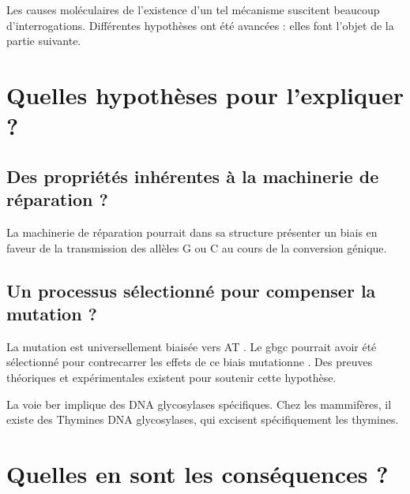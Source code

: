 \documentclass[11pt, oneside]{scrartcl}
\begin{document}
\begin{transition}
  Les causes moléculaires de l'existence d'un tel mécanisme suscitent beaucoup
  d'interrogations. Différentes hypothèses ont été avancées : elles font l'objet
  de la partie suivante. 
\end{transition}

\section{Quelles hypothèses pour l'expliquer ?}
\label{sec:orgheadline11}
\subsection{Des propriétés inhérentes à la machinerie de réparation ?}
\label{sec:orgheadline9}
La machinerie de réparation pourrait dans sa structure présenter un biais en
faveur de la transmission des allèles G ou C au cours de la conversion génique. 
\subsection{Un processus sélectionné pour compenser la mutation ?}
\label{sec:orgheadline10}
La mutation est universellement biaisée vers AT
\cite{lynch_rate_2010,hershberg_evidence_2010}. Le \ac{gbgc} pourrait avoir été
sélectionné pour contrecarrer les effets de ce biais mutationne
\cite{marais_biased_2003}. Des preuves théoriques et expérimentales existent
pour soutenir cette hypothèse.

La voie \ac{ber} implique des DNA glycosylases spécifiques. Chez les mammifères,
il existe des Thymines DNA glycosylases, qui excisent spécifiquement les thymines. 

\section{Quelles en sont les conséquences ?}
\label{sec:orgheadline17}
\end{document}
